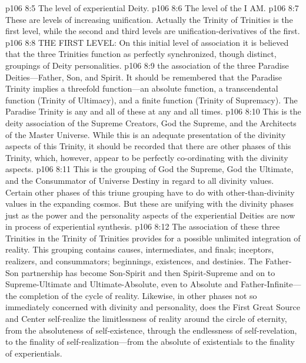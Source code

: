 \vs p106 8:5 \bibnobreakspace The level of experiential Deity.
\vs p106 8:6 \bibnobreakspace The level of the I AM.
\pc \vs p106 8:7 These are levels of increasing unification. Actually the Trinity of Trinities is the first level, while the second and third levels are unification\hyp{}derivatives of the first.
\pc \vs p106 8:8 THE FIRST LEVEL: On this initial level of association it is believed that the three Trinities function as perfectly synchronized, though distinct, groupings of Deity personalities.
\pc \vs p106 8:9 \bibnobreakspace {} the association of the three Paradise Deities---Father, Son, and Spirit. It should be remembered that the Paradise Trinity implies a threefold function---an absolute function, a transcendental function (Trinity of Ultimacy), and a finite function (Trinity of Supremacy). The Paradise Trinity is any and all of these at any and all times.
\pc \vs p106 8:10 \bibnobreakspace {} This is the deity association of the Supreme Creators, God the Supreme, and the Architects of the Master Universe. While this is an adequate presentation of the divinity aspects of this Trinity, it should be recorded that there are other phases of this Trinity, which, however, appear to be perfectly co\hyp{}ordinating with the divinity aspects.
\pc \vs p106 8:11 \bibnobreakspace {} This is the grouping of God the Supreme, God the Ultimate, and the Consummator of Universe Destiny in regard to all divinity values. Certain other phases of this triune grouping have to do with other\hyp{}than\hyp{}divinity values in the expanding cosmos. But these are unifying with the divinity phases just as the power and the personality aspects of the experiential Deities are now in process of experiential synthesis.
\pc \vs p106 8:12 The association of these three Trinities in the Trinity of Trinities provides for a possible unlimited integration of reality. This grouping contains causes, intermediates, and finals; inceptors, realizers, and consummators; beginnings, existences, and destinies. The Father\hyp{}Son partnership has become Son\hyp{}Spirit and then Spirit\hyp{}Supreme and on to Supreme\hyp{}Ultimate and Ultimate\hyp{}Absolute, even to Absolute and Father\hyp{}Infinite---the completion of the cycle of reality. Likewise, in other phases not so immediately concerned with divinity and personality, does the First Great Source and Center self\hyp{}realize the limitlessness of reality around the circle of eternity, from the absoluteness of self\hyp{}existence, through the endlessness of self\hyp{}revelation, to the finality of self\hyp{}realization---from the absolute of existentials to the finality of experientials.
